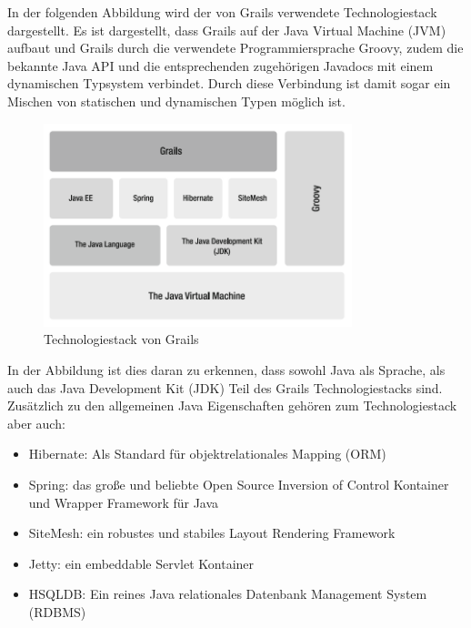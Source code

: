 In der folgenden Abbildung wird der von Grails verwendete Technologiestack dargestellt. Es ist dargestellt, dass Grails auf der Java Virtual Machine (JVM) aufbaut und Grails durch die verwendete Programmiersprache Groovy, zudem die bekannte Java API und die entsprechenden zugehörigen Javadocs mit einem dynamischen Typsystem verbindet. Durch diese Verbindung ist damit sogar ein Mischen von statischen und dynamischen Typen möglich ist.
\begin{figure}[h]
\centering
\includegraphics[width=0.80\textwidth]{img/Grails-Stack.png}
\caption {Technologiestack von Grails}
\end{figure} 
In der Abbildung ist dies daran zu erkennen, dass sowohl Java als Sprache, als auch das Java Development Kit (JDK) Teil des Grails Technologiestacks sind. Zusätzlich zu den allgemeinen Java Eigenschaften gehören zum Technologiestack aber auch:
\begin{itemize}
\item Hibernate: Als Standard für objektrelationales Mapping (ORM)
\item Spring: das große und beliebte Open Source Inversion of Control Kontainer und Wrapper Framework für Java
\item SiteMesh: ein robustes und stabiles Layout Rendering Framework
\item Jetty: ein embeddable Servlet Kontainer
\item HSQLDB: Ein reines Java relationales Datenbank Management System (RDBMS) 
\end{itemize}